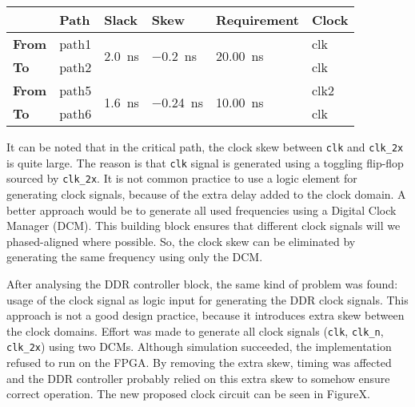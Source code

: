 \documentclass[final]{article}
\begin{document}
\begin{table}
\centering
\begin{tabular}{llllll}
\toprule
     & \textbf{Path}  & \textbf{Slack}                     & \textbf{Skew}                       & \textbf{Requirement}                & \textbf{Clock} \\ 
\midrule
\textbf{From} & path1 & \multirow{2}{*}{\SI{2.0}{\nano\second}} & \multirow{2}{*}{\SI{-0.2}{\nano\second}}  & \multirow{2}{*}{\SI{20.00}{\nano\second}} & clk   \\
\textbf{To}   & path2 &                           &                             &                            & clk   \\ 
\midrule
\textbf{From} & path5 & \multirow{2}{*}{\SI{1.6}{\nano\second}} & \multirow{2}{*}{\SI{-0.24}{\nano\second}} & \multirow{2}{*}{\SI{10.00}{\nano\second}} & clk2  \\
\textbf{To}   & path6 &                           &                             &                            & clk   \\ 
\bottomrule
\end{tabular}
\end{table}

It can be noted that in the critical path, the clock skew between \texttt{clk} and \texttt{clk\_2x} is quite large. The reason is that \texttt{clk} signal is generated using a toggling flip-flop sourced by \texttt{clk\_2x}. It is not common practice to use a logic element for generating clock signals, because of the extra delay added to the clock domain. A better approach would be to generate all used frequencies using a Digital Clock Manager (DCM). This building block ensures that different clock signals will we phased-aligned where possible. So, the clock skew can be eliminated by generating the same frequency using only the DCM.

After analysing the DDR controller block, the same kind of problem was found: usage of the clock signal as logic input for generating the DDR clock signals. This approach is not a good design practice, because it introduces extra skew between the clock domains. Effort was made to generate all clock signals (\texttt{clk}, \texttt{clk\_n}, \texttt{clk\_2x}) using two DCMs. Although simulation succeeded, the implementation refused to run on the FPGA. By removing the extra skew, timing was affected and the DDR controller probably relied on this extra skew to somehow ensure correct operation. The new proposed clock circuit can be seen in FigureX.
\end{document}
